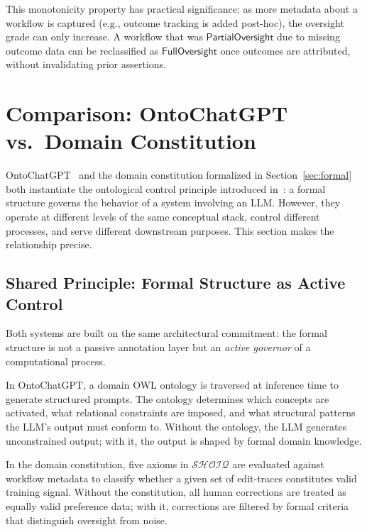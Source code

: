 \documentclass[11pt]{article}
\newcommand{\DL}{\ensuremath{\mathcal{SHOIQ}}\xspace}
\begin{document}
This monotonicity property has practical significance: as more metadata about a workflow is captured (e.g., outcome tracking is added post-hoc), the oversight grade can only increase.
A workflow that was $\mathsf{PartialOversight}$ due to missing outcome data can be reclassified as $\mathsf{FullOversight}$ once outcomes are attributed, without invalidating prior assertions.


\section{Comparison: OntoChatGPT vs.\ Domain Constitution}
\label{sec:comparison}

OntoChatGPT~\citep{palagin2023ontochatgpt} and the domain constitution formalized in Section~\ref{sec:formal} both instantiate the ontological control principle introduced in~\citet{palagin2006architecture}: a formal structure governs the behavior of a system involving an LLM.
However, they operate at different levels of the same conceptual stack, control different processes, and serve different downstream purposes.
This section makes the relationship precise.

\subsection{Shared Principle: Formal Structure as Active Control}
\label{sec:shared-principle}

Both systems are built on the same architectural commitment: the formal structure is not a passive annotation layer but an \emph{active governor} of a computational process.

In OntoChatGPT, a domain OWL ontology is traversed at inference time to generate structured prompts.
The ontology determines which concepts are activated, what relational constraints are imposed, and what structural patterns the LLM's output must conform to.
Without the ontology, the LLM generates unconstrained output; with it, the output is shaped by formal domain knowledge.

In the domain constitution, five axioms in \DL are evaluated against workflow metadata to classify whether a given set of edit-traces constitutes valid training signal.
Without the constitution, all human corrections are treated as equally valid preference data; with it, corrections are filtered by formal criteria that distinguish oversight from noise.
\end{document}
